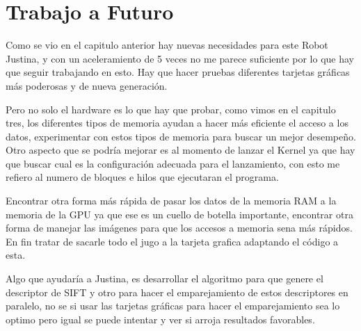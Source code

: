 \chapter{Trabajo a Futuro}

Como se vio en el capitulo anterior hay nuevas necesidades para este Robot Justina, y con un aceleramiento de 5 veces no me parece suficiente  por lo que hay que seguir trabajando en esto. Hay que hacer pruebas diferentes tarjetas gráficas más poderosas y de nueva generación.

Pero no solo el hardware es lo que hay que probar, como vimos en el capitulo tres, los diferentes tipos de memoria ayudan a hacer más eficiente el acceso a los datos, experimentar con estos tipos de memoria para buscar un mejor desempeño. Otro aspecto que se podría mejorar es al momento de lanzar el Kernel ya que hay que buscar cual es la configuración adecuada para el lanzamiento, con esto me refiero al numero de bloques e hilos que ejecutaran el programa. 

Encontrar otra forma más rápida de pasar los datos de la memoria RAM a la memoria de la GPU ya que ese es un cuello de botella importante, encontrar otra forma de manejar las imágenes para que los accesos a memoria sena más rápidos. En fin tratar de sacarle todo el jugo a la tarjeta grafica adaptando el código a esta.  

Algo que ayudaría a Justina, es desarrollar el algoritmo para que genere el descriptor de SIFT y otro para hacer el emparejamiento de estos descriptores en paralelo, no se si usar las tarjetas gráficas para hacer el emparejamiento sea lo optimo pero igual se puede intentar y ver si arroja resultados favorables.  